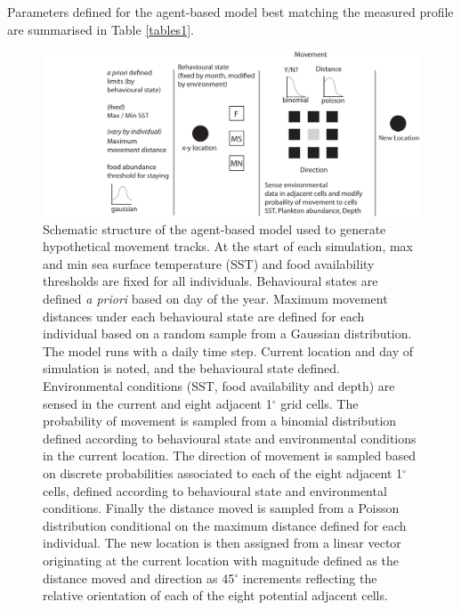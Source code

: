 \documentclass[a4paper,12pt]{article}
\begin{document}
Parameters defined for the agent-based model best matching the measured profile are summarised in Table \ref{tables1}.

\newpage

\begin{landscape}

  \vspace{-1cm}
\begin{figure}[!htbp]
  \centering
  \includegraphics[trim = {3cm 0 0 0}, clip]{figures/flow-diagram-model.pdf}
  \linespread{0.8}
  \caption{
  Schematic structure of the agent-based model used to generate hypothetical movement tracks. 
  At the start of each simulation, max and min sea surface temperature (SST) and food availability thresholds are fixed for all individuals. Behavioural states are defined \textit{a priori} based on day of the year. Maximum movement distances under each behavioural state are defined for each individual based on a random sample from a Gaussian distribution. The model runs with a daily time step. Current location and day of simulation is noted, and the behavioural state defined. Environmental conditions (SST, food availability and depth) are sensed in the current and eight adjacent 1$^{\circ}$ grid cells. The probability of movement is sampled from a binomial distribution defined according to behavioural state and environmental conditions in the current location. The direction of movement is sampled based on discrete probabilities associated to each of the eight adjacent 1$^{\circ}$ cells, defined according to behavioural state and environmental conditions. Finally the distance moved is sampled from a Poisson distribution conditional on the maximum distance defined for each individual. The new location is then assigned from a linear vector originating at the current location with magnitude defined as the distance moved and direction as 45$^{\circ}$ increments reflecting the relative orientation of each of the eight potential adjacent cells.}
  \label{figs5}
\end{figure}


\end{landscape}
\end{document}
